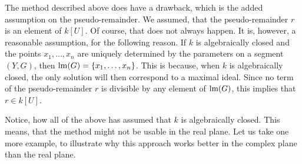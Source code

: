 The method described above does have a drawback, which is the added assumption on the pseudo-remainder. We assumed, that the pseudo-remainder $r$ is an element of $k[U]$. Of course, that does not always happen. It is, however, a reasonable assumption, for the following reason. If $k$ is algebraically closed and the points $x_{1}, \dots, x_{n}$ are uniquely determined by the parameters on a segment $(Y, G)$, then $\operatorname{lm}(G) = \{x_{1}, \dots, x_{n}\}$. This is because, when $k$ is algebraically closed, the only solution will then correspond to a maximal ideal. Since no term of the pseudo-remainder $r$ is divisible by any element of $\operatorname{lm}(G)$, this implies that $r \in k[U]$.

Notice, how all of the above has assumed that $k$ is algebraically closed. This means, that the method might not be usable in the real plane. Let us take one more example, to illustrate why this approach works better in the complex plane than the real plane.

